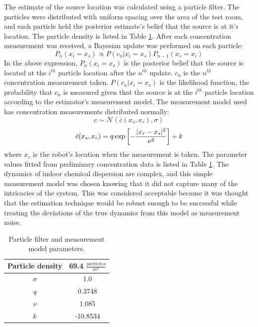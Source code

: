 \documentclass[submit, 12pt]{aiaa-pretty-modified}
\begin{document}
The estimate of the source location was calculated using a particle
filter\cite{maskell2001tutorial}. The particles were distributed with uniform
spacing over the area of the test room, and each particle held the posterior
estimate's belief that the source is at it's location. The particle density is listed in Table
\ref{tab:estimator-parameters}. After each concentration measurement was
received, a Bayesian update was performed on each particle: 
\[P_n(x_i = x_s) \propto P(c_n | x_i = x_s) P_{n-1}(x_s = x_i)\]
In the above expression, $P_n(x_i = x_s)$ is the posterior belief that the source is located at the
$i^{th}$ particle location after the $n^{th}$ update. $c_n$ is the $n^{th}$ concentration
measurement taken. $P(c_n | x_i = x_s)$ is the likelihood function, the probability that $c_n$ is
measured given that the source is at the $i^{th}$ particle location according to
the estimator's measurement model. The measurement model used has concentration
measurements distributed normally: 
\[c \sim \mathcal{N}\left(\bar{c}(x_s,x_r), \sigma \right)\]
\[\bar{c}(x_s,x_r) = q \exp{\left[-\frac{\lvert x_r - x_s\rvert^2}{\nu^2}\right]} + k\]
where $x_r$ is the robot's location when the measurement is taken.  The
parameter values fitted from preliminary concentration data is listed in Table \ref{tab:estimator-parameters}.
The dynamics of indoor chemical dispersion are complex, and this simple
measurement model was chosen knowing that it did not capture many of the
intricacies of the system. This was considered acceptable because it was thought
that the estimation technique would be robust enough to be successful while
treating the deviations of the true dynamics from this model as measurement
noise.

\begin{table}
\caption[Estimator parameters]{Particle filter and measurement model parameters.}
\begin{center}
\begin{tabular}{|c|c|}
\hline
Particle density & 69.4 $\frac{particles}{m^2}$ \\ \hline
$\sigma$ & 1.0 \\ \hline
$q$ & 0.3748 \\ \hline
$\nu$ & 1.085  \\ \hline
$k$ & -10.8534  \\ \hline
\end{tabular}
\end{center}
\label{tab:estimator-parameters}
\end{table}
\end{document}
